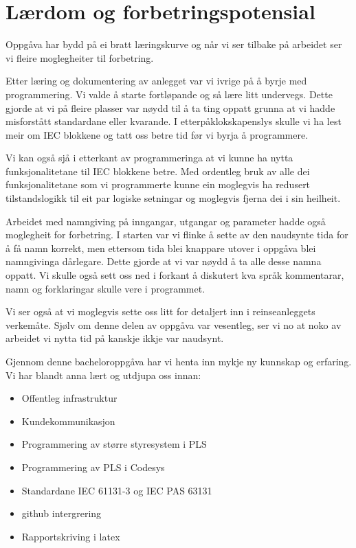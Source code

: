 \section{Lærdom og forbetringspotensial}
\thispagestyle{fancy}

Oppgåva har bydd på ei bratt læringskurve og når vi ser tilbake på arbeidet ser vi fleire moglegheiter til forbetring.

Etter læring og dokumentering av anlegget var vi ivrige på å byrje med programmering.
Vi valde å starte fortløpande og så lære litt undervegs.
Dette gjorde at vi på fleire plasser var nøydd til å ta ting oppatt grunna at vi hadde misforstått standardane eller kvarande.
I etterpåklokskapenslys skulle vi ha lest meir om \gls{IEC} blokkene og tatt oss betre tid før vi byrja å programmere.

Vi kan også sjå i etterkant av programmeringa at vi kunne ha nytta funksjonalitetane til \gls{IEC} blokkene betre.
Med ordentleg bruk av alle dei funksjonalitetane som vi programmerte kunne ein moglegvis ha redusert tilstandslogikk
til eit par logiske setningar og moglegvis fjerna dei i sin heilheit.

Arbeidet med namngiving på inngangar, utgangar og parameter hadde også moglegheit for forbetring.
I starten var vi flinke å sette av den naudsynte tida for å få namn korrekt, men ettersom tida blei knappare utover i oppgåva
blei namngivinga dårlegare. Dette gjorde at vi var nøydd å ta alle desse namna oppatt. \newline
Vi skulle også sett oss ned i forkant å diskutert kva språk kommentarar, namn og forklaringar skulle vere i programmet.

Vi ser også at vi moglegvis sette oss litt for detaljert inn i reinseanleggets verkemåte.
Sjølv om denne delen av oppgåva var vesentleg, ser vi no at noko av arbeidet vi nytta tid på kanskje ikkje var naudsynt.

Gjennom denne bacheloroppgåva har vi henta inn mykje ny kunnskap og erfaring.
Vi har blandt anna lært og utdjupa oss innan:

\begin{itemize}
    \item Offentleg infrastruktur
    \item Kundekommunikasjon
    \item Programmering av større styresystem i \gls{PLS}
    \item Programmering av \gls{PLS} i \gls{Codesys}
    \item Standardane \gls{IEC} 61131-3 og \gls{IEC} \gls{PAS} 63131
    \item \Gls{github} intergrering
    \item Rapportskriving i \gls{latex}
\end{itemize}







